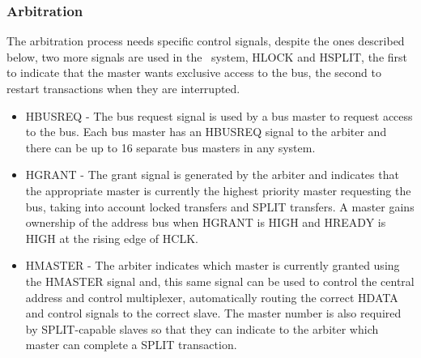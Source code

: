  
 \subsubsection{Arbitration}
 
 The arbitration process needs specific control signals, despite the ones described below, two more signals are used in the \amba~system, HLOCK and HSPLIT,  the first to indicate that the master wants exclusive access to the bus, the second to restart transactions when they are interrupted.
 
 \begin{itemize}

\item  {HBUSREQ - } The bus request signal is used by a bus master to request access to the bus. Each bus master has an HBUSREQ signal to the arbiter and there can be up to 16 separate bus masters in any system.


\item  {HGRANT - } The grant signal is generated by the arbiter and indicates that the appropriate master is currently the highest priority master requesting the bus, taking into account locked transfers and SPLIT transfers. A master gains ownership of the address bus when HGRANT is HIGH and HREADY is HIGH at the rising edge of HCLK.

\item  {HMASTER - } The arbiter indicates which master is currently granted using the HMASTER signal and,  this same signal can be used to control the central address and control multiplexer, automatically routing the correct HDATA and control signals to the correct slave. The master number is also required by SPLIT-capable slaves so that they can indicate to the arbiter which master can complete a SPLIT transaction.


\end{itemize}

